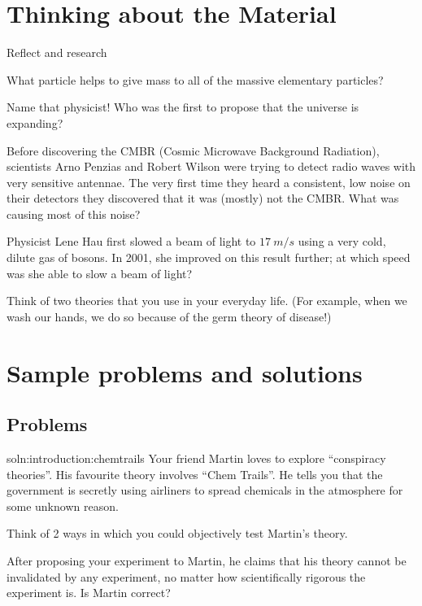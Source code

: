 \section{Thinking about the Material}
\vspace{0.5cm}
\begin{chapteractivity}{Reflect and research}
{
\item What particle helps to give mass to all of the massive elementary particles?
\item Name that physicist! Who was the first to propose that the universe is expanding?
\item Before discovering the CMBR (Cosmic Microwave Background Radiation), scientists Arno Penzias and Robert Wilson were trying to detect radio waves with very sensitive antennae. The very first time they heard a consistent, low noise on their detectors they discovered that it was (mostly) not the CMBR. What was causing most of this noise?
\item Physicist Lene Hau first slowed a beam of light to $\SI{17}{m/s}$ using a very cold, dilute gas of bosons. In 2001, she improved on this result further; at which speed was she able to slow a beam of light?
\item Think of two theories that you use in your everyday life. (For example, when we wash our hands, we do so because of the germ theory of disease!)
}
\end{chapteractivity}

\newpage
\section{Sample problems and solutions}
\subsection{Problems}
\begin{problemParts}{soln:introduction:chemtrails}{\label{prob:introduction:chemtrails} Your friend Martin loves to explore ``conspiracy theories''. His favourite theory involves ``Chem Trails''. He tells you that the government is secretly using airliners to spread chemicals in the atmosphere for some unknown reason.}
\item Think of 2 ways in which you could objectively test Martin's theory.
\item After proposing your experiment to Martin, he claims that his theory cannot be invalidated by any experiment, no matter how scientifically rigorous the experiment is. Is Martin correct?
\end{problemParts}
\newpage
